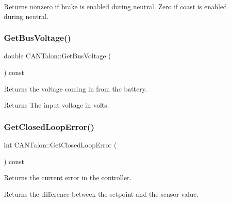 \begin{DoxyReturn}{Returns}
nonzero if brake is enabled during neutral. Zero if coast is enabled during neutral. 
\end{DoxyReturn}
\mbox{\label{class_c_a_n_talon_a54bf29776c50598a1a9686651f6fadd0}} 
\subsubsection{\texorpdfstring{Get\+Bus\+Voltage()}{GetBusVoltage()}}
{\footnotesize\ttfamily double C\+A\+N\+Talon\+::\+Get\+Bus\+Voltage (\begin{DoxyParamCaption}{ }\end{DoxyParamCaption}) const\hspace{0.3cm}{\ttfamily [override]}}

Returns the voltage coming in from the battery.

\begin{DoxyReturn}{Returns}
The input voltage in volts. 
\end{DoxyReturn}
\mbox{\label{class_c_a_n_talon_ae96f0f4eda41e611866453636382780b}} 
\subsubsection{\texorpdfstring{Get\+Closed\+Loop\+Error()}{GetClosedLoopError()}}
{\footnotesize\ttfamily int C\+A\+N\+Talon\+::\+Get\+Closed\+Loop\+Error (\begin{DoxyParamCaption}{ }\end{DoxyParamCaption}) const\hspace{0.3cm}{\ttfamily [virtual]}}

Returns the current error in the controller.

\begin{DoxyReturn}{Returns}
the difference between the setpoint and the sensor value. 
\end{DoxyReturn}
\mbox{\label{class_c_a_n_talon_a3ef9f9053e55afd0bfb5a5fd85359743}} 

